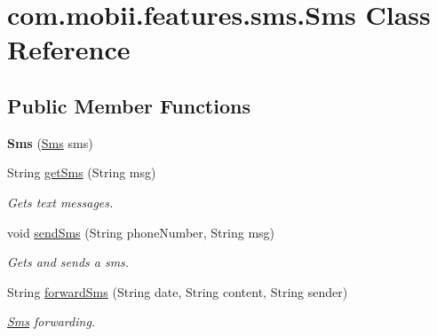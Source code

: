 \hypertarget{classcom_1_1mobii_1_1features_1_1sms_1_1_sms}{\section{com.\-mobii.\-features.\-sms.\-Sms Class Reference}
\label{classcom_1_1mobii_1_1features_1_1sms_1_1_sms}
}
\subsection*{Public Member Functions}
\begin{DoxyCompactItemize}
\item 
\hypertarget{classcom_1_1mobii_1_1features_1_1sms_1_1_sms_a3e71b478d93c0f06b4a4b016759d9a74}{{\bfseries Sms} (\hyperlink{classcom_1_1mobii_1_1features_1_1sms_1_1_sms}{Sms} sms)}\label{classcom_1_1mobii_1_1features_1_1sms_1_1_sms_a3e71b478d93c0f06b4a4b016759d9a74}

\item 
String \hyperlink{classcom_1_1mobii_1_1features_1_1sms_1_1_sms_a6c3763f3cb6e8aef74be2a0814a6d078}{get\-Sms} (String msg)
\begin{DoxyCompactList}\small\item\em Gets text messages. \end{DoxyCompactList}\item 
void \hyperlink{classcom_1_1mobii_1_1features_1_1sms_1_1_sms_afc0a1cf03bb9a9c88976382555fb0071}{send\-Sms} (String phone\-Number, String msg)
\begin{DoxyCompactList}\small\item\em Gets and sends a sms. \end{DoxyCompactList}\item 
String \hyperlink{classcom_1_1mobii_1_1features_1_1sms_1_1_sms_a9d0bed2bde4f83151b0e37e030858aff}{forward\-Sms} (String date, String content, String sender)
\begin{DoxyCompactList}\small\item\em \hyperlink{classcom_1_1mobii_1_1features_1_1sms_1_1_sms}{Sms} forwarding. \end{DoxyCompactList}\end{DoxyCompactItemize}


